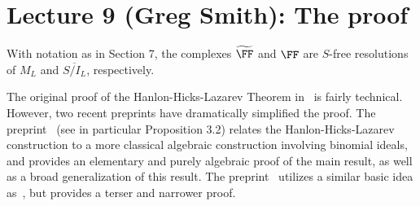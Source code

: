 \documentclass{amsart}
\begin{document}
\section{Lecture 9 (Greg Smith): The proof}\label{lec:9-HHL-proof}

\begin{theorem} \cite{HHL24}\label{thm:HHL-resolution}
With notation as in Section 7, the complexes $\tF$ and $\FF$ are $S$-free resolutions of $M_{L}$ and $\overline{S/I_{L}}$, respectively. 
\end{theorem}

The original proof of the Hanlon-Hicks-Lazarev Theorem in~\cite{HHL24} is fairly technical.  However, two recent preprints have dramatically simplified the proof.  The preprint~\cite{BCS+25} (see in particular Proposition 3.2) relates the Hanlon-Hicks-Lazarev construction to a more classical algebraic construction involving binomial ideals, and provides an elementary and purely algebraic proof of the main result, as well as a broad generalization of this result.  The preprint~\cite{BH25} utilizes a similar basic idea as~\cite{BCS+25}, but provides a terser and narrower proof.
\end{document}
